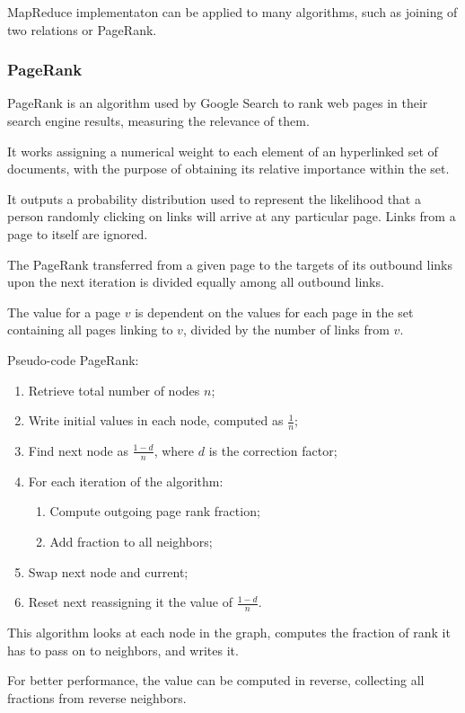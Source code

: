 MapReduce implementaton can be applied to many algorithms, such as joining of two relations or PageRank.

\subsubsection{PageRank}
PageRank is an algorithm used by Google Search to rank web pages in their search engine results, measuring the relevance of them.

It works assigning a numerical weight to each element of an hyperlinked set of documents, with the purpose of obtaining its relative importance within the set.

It outputs a probability distribution used to represent the likelihood that a person randomly clicking on links will arrive at any particular page. Links from a page to itself are ignored.

The PageRank transferred from a given page to the targets of its outbound links upon the next iteration is divided equally among all outbound links. 

The value for a page $v$ is dependent on the values for each page  in the set containing all pages linking to $v$, divided by the number of links from $v$.

Pseudo-code PageRank:
\begin{enumerate}
	\item Retrieve total number of nodes $n$;
	\item Write initial values in each node, computed as $\frac{1}{n}$;
	\item Find next node as $\frac{1-d}{n}$, where $d$ is the correction factor;
	\item For each iteration of the algorithm:
	\begin{enumerate}
		\item Compute outgoing page rank fraction;
		\item Add fraction to all neighbors;
	\end{enumerate}
	\item Swap next node and current;
	\item Reset next reassigning it the value of $\frac{1-d}{n}$.
\end{enumerate}

This algorithm looks at each node in the graph, computes the fraction of rank it has to pass on to neighbors, and writes it.

For better performance, the value can be computed in reverse, collecting all fractions from reverse neighbors.

